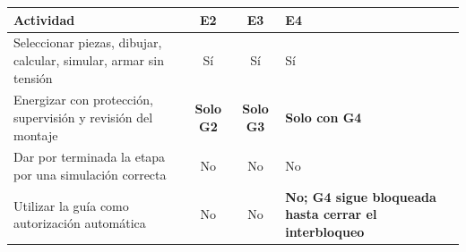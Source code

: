 \documentclass[10pt, a4paper, landscape]{article}
\begin{document}
\noindent
\begin{minipage}[t]{0.49\linewidth}
{\footnotesize
\renewcommand{\arraystretch}{1.18}%
\noindent\begin{tabularx}{\linewidth}{|>{\raggedright\arraybackslash}X|c|c|>{\raggedright\arraybackslash}p{3.8cm}|}
\hline
\rowcolor{ucbgray}
\textbf{Actividad} & \textbf{E2} & \textbf{E3} & \textbf{E4} \\ \hline
Seleccionar piezas, dibujar, calcular, simular, armar sin tensión & Sí & Sí & Sí \\ \hline
Energizar con protección, supervisión y revisión del montaje & \textbf{Solo G2} & \textbf{Solo G3} & \textbf{Solo con G4} \\ \hline
Dar por terminada la etapa por una simulación correcta & No & No & No \\ \hline
Utilizar la guía como autorización automática & No & No & \textbf{\textcolor{warnred}{No; G4 sigue bloqueada hasta cerrar el interbloqueo}} \\ \hline
\end{tabularx}\par}

\vspace{0.12cm}
\end{minipage}\hfill
\end{document}
